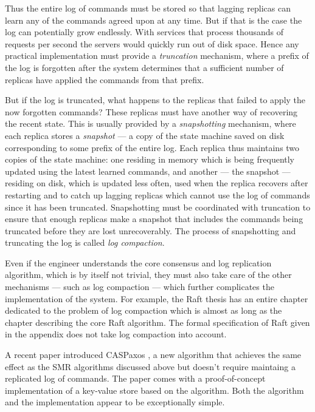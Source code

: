 \documentclass[12pt,a4paper,en]{pracamgr}
\newcommand{\ti}[1]{\textit{#1}}
\begin{document}
Thus the entire log of commands must be stored so that lagging replicas can learn any of the commands agreed upon at any time. But if that is the case the log can potentially grow endlessly. With services that process thousands of requests per second the servers would quickly run out of disk space. Hence any practical implementation must provide a \ti{truncation} mechanism, where a prefix of the log is forgotten after the system determines that a sufficient number of replicas have applied the commands from that prefix.

But if the log is truncated, what happens to the replicas that failed to apply the now forgotten commands? These replicas must have another way of recovering the recent state. This is usually provided by a \ti{snapshotting} mechanism, where each replica stores a \ti{snapshot} --- a copy of the state machine saved on disk corresponding to some prefix of the entire log. Each replica thus maintains two copies of the state machine: one residing in memory which is being frequently updated using the latest learned commands, and another --- the snapshot --- residing on disk, which is updated less often, used when the replica recovers after restarting and to catch up lagging replicas which cannot use the log of commands since it has been truncated. Snapshotting must be coordinated with truncation to ensure that enough replicas make a snapshot that includes the commands being truncated before they are lost unrecoverably. The process of snapshotting and truncating the log is called \ti{log compaction}.

Even if the engineer understands the core consensus and log replication algorithm, which is by itself not trivial, they must also take care of the other mechanisms --- such as log compaction --- which further complicates the implementation of the system. For example, the Raft thesis \cite{bridging} has an entire chapter dedicated to the problem of log compaction which is almost as long as the chapter describing the core Raft algorithm. The formal specification of Raft given in the appendix does not take log compaction into account.

A recent paper introduced CASPaxos \cite{caspaxos}, a new algorithm that achieves the same effect as the SMR algorithms discussed above but doesn't require maintaing a replicated log of commands. The paper comes with a proof-of-concept implementation of a key-value store based on the algorithm. Both the algorithm and the implementation appear to be exceptionally simple.
\end{document}
